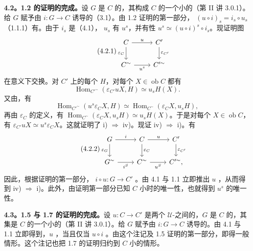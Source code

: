 \textbf{4.2。1.2 的证明的完成。}设 $G$ 是 $C$ 的，其构成 $C$ 的一个小的（第 II 讲 3.0.1）。给 $G$ 赋予由 $i:G\to C$ 诱导的（3.1）。由 1.2 证明的第一部分， $(u\circ i)_s=i_s\circ u_s$（1.1.1）有。由于 $i_s$ 是（4.1）， $u_s$ 有 $u^s$，并有性 $u^s\simeq(u\circ i)^s\circ i_s$。现证明图
\begin{equation}\tag{4.2.1}
\begin{tikzcd}
 C\arrow[r,"u"]\arrow[d,"\varepsilon_C"']&C'\arrow[d,"\varepsilon_{C'}"]\\
 C^{\sim}\arrow[r,"u^s"']&C'^{\sim}
\end{tikzcd}
\end{equation}
在意义下交换。对 $C'$ 上的每个 $H$，对每个 $X\in\operatorname{ob}C$ 都有
\[
 \operatorname{Hom}_{C'^{\sim}}(\varepsilon_{C'}uX,H)\simeq u_sH(X).
\]
又由，有
\[
 \operatorname{Hom}_{C'^{\sim}}(u^s\varepsilon_CX,H)\simeq\operatorname{Hom}_{C^{\sim}}(\varepsilon_CX,u_sH),
\]
再由 $\varepsilon_C$ 的定义，有 $\operatorname{Hom}_{C^{\sim}}(\varepsilon_CX,u_sH)\simeq u_sH(X)$。于是对每个 $X\in\operatorname{ob}C$，有 $\varepsilon_{C'}uX\simeq u^s\varepsilon_CX$。这就证明了 i) $\Rightarrow$ iv)。现证 iv) $\Rightarrow$ i)。有
\begin{equation}\tag{4.2.2}
\begin{tikzcd}
 G\arrow[r,"i"]\arrow[d,"\varepsilon_G"']&C\arrow[r,"u"]\arrow[d,"\varepsilon_C"]&C'\arrow[d,"\varepsilon_{C'}"]\\
 G^{\sim}\arrow[r,"i^S"']&C^{\sim}\arrow[r,"u^S"']&C'^{\sim},
\end{tikzcd}
\end{equation}
因此，根据证明的第一部分， $i\circ u:G\to C'$ 。由 4.1 与 1.1 立即推出 $u$ ，从而得到 iv) $\Rightarrow$ i)。此外，由证明第一部分已知 $C$ 小时的唯一性，也就得到 $u^s$ 的唯一性。

\textbf{4.3。1.5 与 1.7 的证明的完成。}设 $u:C\to C'$ 是两个 $\mathcal U$-之间的，$G$ 是 $C$ 的，其集是 $C$ 的一个小的（第 II 讲 3.0.1）。给 $G$ 赋予由 $i:G\to C$ 诱导的。由 4.1 与 1.1 立即得到，$u$ ，当且仅当 $u\circ i$ 。由这个注记及 1.5 证明的第一部分，即得一般情形。这个注记也把 1.7 的证明归约到 $C$ 小的情形。

